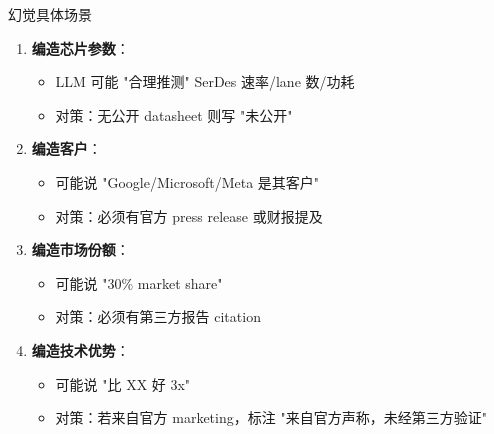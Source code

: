 \documentclass[UTF8,11pt,aspectratio=169]{beamer}
\begin{document}
\begin{frame}{幻觉具体场景}
    \begin{enumerate}
        \item \textbf{编造芯片参数}：
            \begin{itemize}
                \item LLM 可能 "合理推测" SerDes 速率/lane 数/功耗
                \item \alert{对策}：无公开 datasheet 则写 "未公开"
            \end{itemize}

        \item \textbf{编造客户}：
            \begin{itemize}
                \item 可能说 "Google/Microsoft/Meta 是其客户"
                \item \alert{对策}：必须有官方 press release 或财报提及
            \end{itemize}

        \item \textbf{编造市场份额}：
            \begin{itemize}
                \item 可能说 "30\% market share"
                \item \alert{对策}：必须有第三方报告 citation
            \end{itemize}

        \item \textbf{编造技术优势}：
            \begin{itemize}
                \item 可能说 "比 XX 好 3x"
                \item \alert{对策}：若来自官方 marketing，标注 "来自官方声称，未经第三方验证"
            \end{itemize}
    \end{enumerate}
\end{frame}
\end{document}
